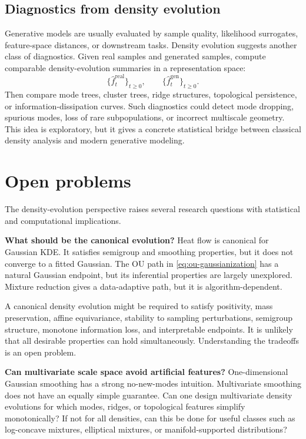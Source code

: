 \documentclass[preprint]{imsart}
\theoremstyle{plain}
\theoremstyle{definition}
\newcommand{\fhat}{\widehat f}
\begin{document}
\subsection{Diagnostics from density evolution}
\label{subsec:generative-diagnostics}

Generative models are usually evaluated by sample quality, likelihood surrogates, feature-space distances, or downstream tasks. Density evolution suggests another class of diagnostics. Given real samples and generated samples, compute comparable density-evolution summaries in a representation space:
\[
  \{\fhat_t^{\mathrm{real}}\}_{t\ge0},
  \qquad
  \{\fhat_t^{\mathrm{gen}}\}_{t\ge0}.
\]
Then compare mode trees, cluster trees, ridge structures, topological persistence, or information-dissipation curves. Such diagnostics could detect mode dropping, spurious modes, loss of rare subpopulations, or incorrect multiscale geometry. This idea is exploratory, but it gives a concrete statistical bridge between classical density analysis and modern generative modeling.

\section{Open problems}
\label{sec:open-problems}

The density-evolution perspective raises several research questions with statistical and computational implications.


\smallskip 
\noindent \textbf{What should be the canonical evolution?} Heat flow is canonical for Gaussian KDE. It satisfies semigroup and smoothing properties, but it does not converge to a fitted Gaussian. The OU path in \eqref{eq:ou-gaussianization} has a natural Gaussian endpoint, but its inferential properties are largely unexplored. Mixture reduction gives a data-adaptive path, but it is algorithm-dependent.

A canonical density evolution might be required to satisfy positivity, mass preservation, affine equivariance, stability to sampling perturbations, semigroup structure, monotone information loss, and interpretable endpoints. It is unlikely that all desirable properties can hold simultaneously. Understanding the tradeoffs is an open problem.

\smallskip 
\noindent \textbf{Can multivariate scale space avoid artificial features?} One-dimensional Gaussian smoothing has a strong no-new-modes intuition. Multivariate smoothing does not have an equally simple guarantee. Can one design multivariate density evolutions for which modes, ridges, or topological features simplify monotonically? If not for all densities, can this be done for useful classes such as log-concave mixtures, elliptical mixtures, or manifold-supported distributions?
\end{document}
